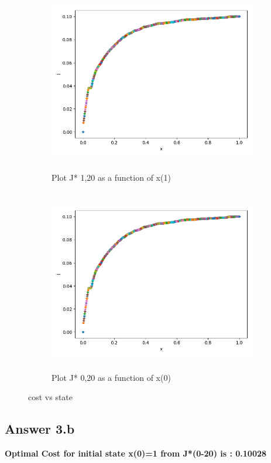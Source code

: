 \documentclass[12pt]{article}
\begin{document}
\begin{figure}[H]

\begin{subfigure}{}
\centering
\includegraphics[width=10cm, height=8cm, centre]{3a1.png} 
\caption{Plot J* 1,20 as a function of x(1)}
\label{fig:subim1}
\end{subfigure}

\begin{subfigure}{}
\centering
\includegraphics[width=10cm, height=8cm, centre]{3a0.png} 
\caption{Plot J* 0,20 as a function of x(0)}
\label{fig:subim1}
\end{subfigure}

\caption{cost vs state}
\label{fig:image2}
\end{figure}


\subsection*{Answer 3.b}

{
\bfseries Optimal Cost for initial state x(0)=1 from J*(0-20) is : 0.10028
}
\end{document}
